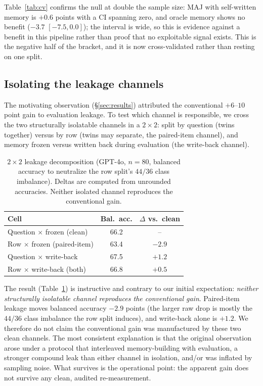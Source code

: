 \documentclass[]{ceurart}
\begin{document}
Table~\ref{tab:cv} confirms the null at double the sample size: MAJ with self-written memory is $+0.6$ points with a CI spanning zero, and oracle memory shows no benefit ($-3.7$ $[-7.5, 0.0]$); the interval is wide, so this is evidence against a benefit in this pipeline rather than proof that no exploitable signal exists. This is the negative half of the bracket, and it is now cross-validated rather than resting on one split.

\subsection{Isolating the leakage channels}
\label{sec:channels}

The motivating observation (\S\ref{sec:results}) attributed the conventional $+6$--$10$ point gain to evaluation leakage. To test which channel is responsible, we cross the two structurally isolatable channels in a $2\times2$: split by question (twins together) versus by row (twins may separate, the paired-item channel), and memory frozen versus written back during evaluation (the write-back channel).

\begin{table}[t]
\centering
\small
\caption{$2\times2$ leakage decomposition (GPT-4o, $n{=}80$, balanced accuracy to neutralize the row split's $44/36$ class imbalance). Deltas are computed from unrounded accuracies. Neither isolated channel reproduces the conventional gain.}
\label{tab:channels}
\begin{tabular}{lcc}
\toprule
Cell & Bal.\ acc. & $\Delta$ vs.\ clean \\
\midrule
Question $\times$ frozen (clean) & 66.2 & -- \\
Row $\times$ frozen (paired-item) & 63.4 & $-2.9$ \\
Question $\times$ write-back & 67.5 & $+1.2$ \\
Row $\times$ write-back (both) & 66.8 & $+0.5$ \\
\bottomrule
\end{tabular}

\end{table}

The result (Table~\ref{tab:channels}) is instructive and contrary to our initial expectation: \emph{neither structurally isolatable channel reproduces the conventional gain}. Paired-item leakage moves balanced accuracy $-2.9$ points (the larger raw drop is mostly the $44/36$ class imbalance the row split induces), and write-back alone is $+1.2$. We therefore do not claim the conventional gain was manufactured by these two clean channels. The most consistent explanation is that the original observation arose under a protocol that interleaved memory-building with evaluation, a stronger compound leak than either channel in isolation, and/or was inflated by sampling noise. What survives is the operational point: the apparent gain does not survive any clean, audited re-measurement.
\end{document}
